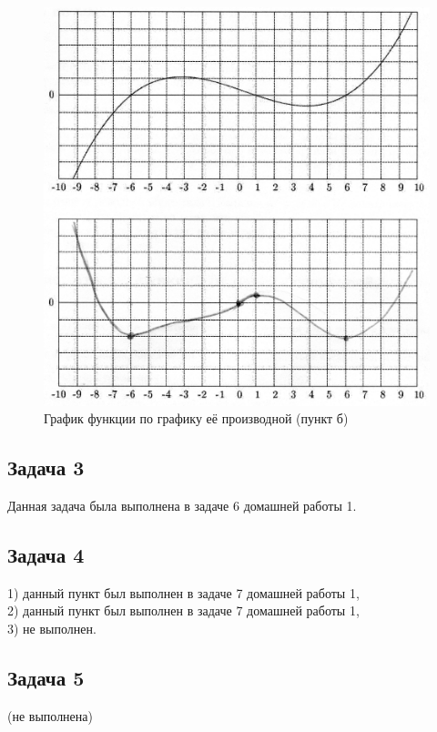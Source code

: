 \documentclass[a4paper,11pt]{article}
\begin{document}
\begin{figure}[h!]
  \centering
    \includegraphics[scale=0.7]{images/task2b.jpg}
  \caption{График функции по графику её производной (пункт б)}
  \label{fig:task2b}
\end{figure}

\subsection{Задача 3}

Данная задача была выполнена в задаче 6 домашней работы 1.

\subsection{Задача 4}

1) данный пункт был выполнен в задаче 7 домашней работы 1,\\
2) данный пункт был выполнен в задаче 7 домашней работы 1,\\
3) не выполнен.

\subsection{Задача 5}

(не выполнена)
\end{document}
